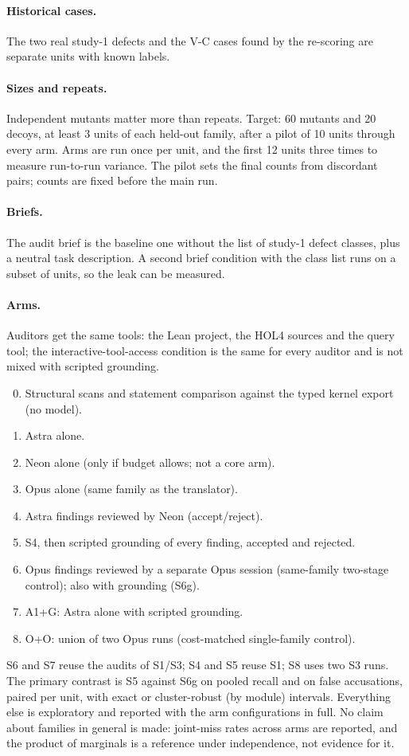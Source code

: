 \documentclass[11pt,a4paper]{article}
\begin{document}
\paragraph{Historical cases.} The two real study-1 defects and the V-C cases found by the re-scoring are separate units with known labels.
\paragraph{Sizes and repeats.} Independent mutants matter more than repeats. Target: 60 mutants and 20 decoys, at least 3 units of each held-out family, after a pilot of 10 units through every arm. Arms are run once per unit, and the first 12 units three times to measure run-to-run variance. The pilot sets the final counts from discordant pairs; counts are fixed before the main run.
\paragraph{Briefs.} The audit brief is the baseline one without the list of study-1 defect classes, plus a neutral task description. A second brief condition with the class list runs on a subset of units, so the leak can be measured.
\paragraph{Arms.} Auditors get the same tools: the Lean project, the HOL4 sources and the query tool; the interactive-tool-access condition is the same for every auditor and is not mixed with scripted grounding.
\begin{enumerate}[label=S\arabic*.]\setcounter{enumi}{-1}
\item Structural scans and statement comparison against the typed kernel export (no model).
\item Astra alone.
\item Neon alone (only if budget allows; not a core arm).
\item Opus alone (same family as the translator).
\item Astra findings reviewed by Neon (accept/reject).
\item S4, then scripted grounding of every finding, accepted and rejected.
\item Opus findings reviewed by a separate Opus session (same-family two-stage control); also with grounding (S6g).
\item A1+G: Astra alone with scripted grounding.
\item O+O: union of two Opus runs (cost-matched single-family control).
\end{enumerate}
S6 and S7 reuse the audits of S1/S3; S4 and S5 reuse S1; S8 uses two S3 runs. The primary contrast is S5 against S6g on pooled recall and on false accusations, paired per unit, with exact or cluster-robust (by module) intervals. Everything else is exploratory and reported with the arm configurations in full. No claim about families in general is made: joint-miss rates across arms are reported, and the product of marginals is a reference under independence, not evidence for it.
\end{document}
